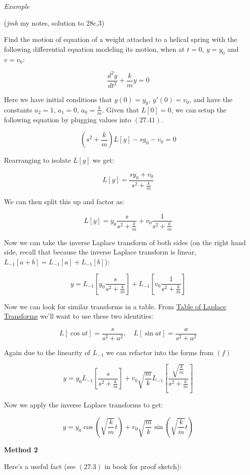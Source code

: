 \documentclass{article}
\begin{document}
\emph{Example}

(\emph{jmh} my notes, solution to 28c,3)

Find the motion of equation of a weight attached to a helical spring with the following differential equation modeling its motion, when at $t = 0$, $y = y_0$ and $v = v_0$:

\[ \tag{a} \frac{d^2 y}{dt^2} + \frac{k}{m}y = 0 \]

Here we have initial conditions that $y(0) = y_0$, $y'(0) = v_0$, and have the constants $a_2 = 1$, $a_1 = 0$, $a_0 = \frac{k}{m}$. Given that $L[0] = 0$, we can setup the following equation by plugging values into $(27.41)$.

\[ \tag{b} (s^2 + \frac{k}{m})L[y] - s y_0 - v_0 = 0 \]

Rearranging to isolate $L[y]$ we get:

\[ \tag{c} L[y] = \frac{s y_0 + v_0}{s^2 + \frac{k}{m}} \]

We can then split this up and factor as:

\[ \tag{d} L[y] = y_0 \frac{s}{s^2 + \frac{k}{m}} + v_0 \frac{1}{s^2 + \frac{k}{m}} \]

Now we can take the inverse Laplace transform of both sides (on the right hand side, recall that because the inverse Laplace transform is linear, $L_{-1}[a + b] = L_{-1}[a] + L_{-1}[b]$):

\[ \tag{e} y = L_{-1}[y_0 \frac{s}{s^2 + \frac{k}{m}}] + L_{-1}[v_0 \frac{1}{s^2 + \frac{k}{m}}] \]

Now we can look for similar transforms in a table. From \href{https://tutorial.math.lamar.edu/classes/de/laplace_table.aspx}{Table of Laplace Transforms} we'll want to use these two identities:

\[ \tag{f} L[\cos{at}] = \frac{s}{s^2 + a^2}, \quad  L[\sin{at}] = \frac{a}{s^2 + a^2} \]

Again due to the linearity of $L_{-1}$ we can refactor into the forms from $(f)$

\[ \tag{g} y = y_0 L_{-1}[\frac{s}{s^2 + \frac{k}{m}}] + v_0 \sqrt{\frac{m}{k}} L_{-1}[\frac{\sqrt{\frac{k}{m}}}{s^2 + \frac{k}{m}}] \]

Now we apply the inverse Laplace transforms to get:

\[ \tag{h} y = y_0 \cos{(\sqrt{\frac{k}{m}}t)} + v_0 \sqrt{\frac{m}{k}} \sin{(\sqrt{\frac{k}{m}}t)} \]

\textbf{Method 2}

Here's a useful fact (see $(27.3)$ in book for proof sketch):
\end{document}
